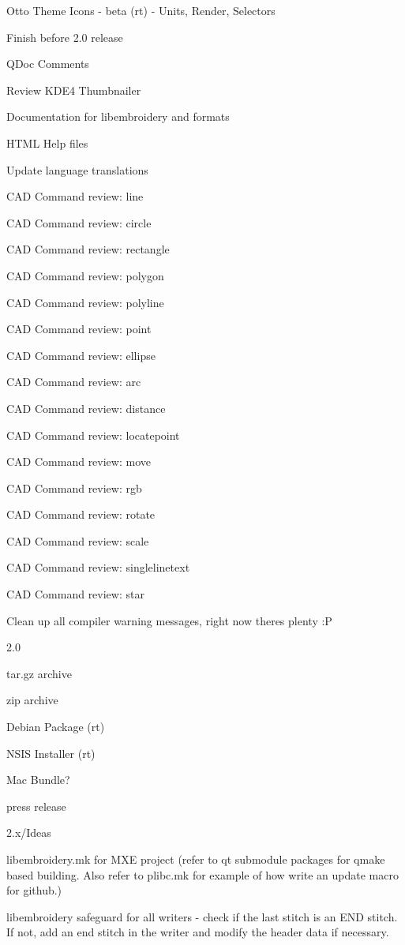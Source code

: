   \item Otto Theme Icons - beta (rt) - Units, Render, Selectors
\item Finish before 2.0 release
  \item QDoc Comments
  \item Review KDE4 Thumbnailer
  \item Documentation for libembroidery and formats
  \item HTML Help files
  \item Update language translations
  \item CAD Command review: line
  \item CAD Command review: circle
  \item CAD Command review: rectangle
  \item CAD Command review: polygon
  \item CAD Command review: polyline
  \item CAD Command review: point
  \item CAD Command review: ellipse
  \item CAD Command review: arc
  \item CAD Command review: distance
  \item CAD Command review: locatepoint
  \item CAD Command review: move
  \item CAD Command review: rgb
  \item CAD Command review: rotate
  \item CAD Command review: scale
  \item CAD Command review: singlelinetext
  \item CAD Command review: star
  \item Clean up all compiler warning messages, right now theres plenty :P
\item 2.0
  \item tar.gz archive
  \item zip archive
  \item Debian Package (rt)
  \item NSIS Installer (rt)
  \item Mac Bundle?
  \item press release
\item 2.x/Ideas
  \item libembroidery.mk for MXE project (refer to qt submodule packages for qmake based building. Also refer to plibc.mk for example of how write an update macro for github.)
  \item libembroidery safeguard for all writers - check if the last stitch is an END stitch. If not, add an end stitch in the writer and modify the header data if necessary.
